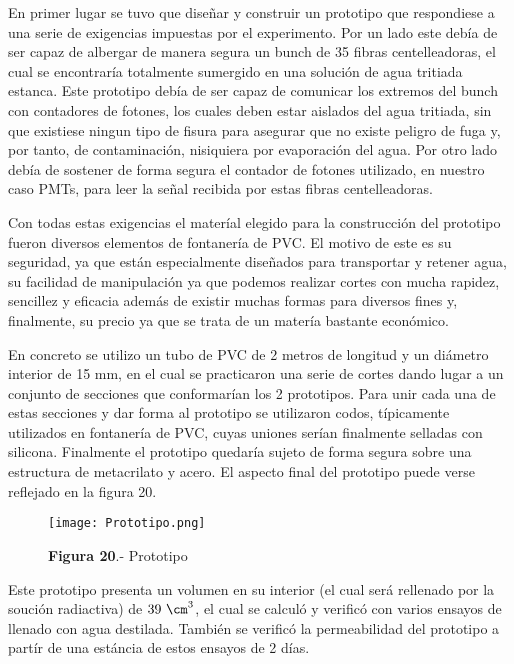 En primer lugar se tuvo que diseñar y construir un prototipo que respondiese a una serie de exigencias impuestas por el experimento. Por un lado este debía de ser capaz de albergar de manera segura  un bunch de 35 fibras centelleadoras, el cual se encontraría totalmente sumergido en una solución de agua tritiada estanca. Este prototipo debía de ser capaz de comunicar los extremos del bunch con contadores de fotones, los cuales deben estar aislados del agua tritiada, sin que existiese ningun tipo de fisura para asegurar que no existe peligro de fuga y, por tanto, de contaminación, nisiquiera por evaporación del agua. Por otro lado debía de sostener de forma segura el contador de fotones utilizado, en nuestro caso PMTs, para leer la señal recibida por estas fibras centelleadoras.

Con todas estas exigencias el materíal elegido para la construcción del prototipo fueron diversos elementos de fontanería de PVC. El motivo de este es su seguridad, ya que están especialmente diseñados para transportar y retener agua, su facilidad de manipulación ya que podemos realizar cortes con mucha rapidez, sencillez y eficacia además de existir muchas formas para diversos fines y, finalmente, su precio ya que se trata de un matería bastante económico. 

En concreto se utilizo un tubo de PVC de 2 metros de longitud y un diámetro interior de 15 mm, en el cual se practicaron una serie de cortes dando lugar a un conjunto de secciones que conformarían los 2 prototipos. Para unir cada una de estas secciones y dar forma al prototipo se utilizaron codos, típicamente utilizados en fontanería de PVC, cuyas uniones serían finalmente selladas con silicona. Finalmente el prototipo quedaría sujeto de forma segura sobre una estructura de metacrilato y acero. El aspecto final del prototipo puede verse reflejado en la figura 20.

\begin{figure}[hbtp]
\centering
\texttt{[image: Prototipo.png]}
\caption{\textbf{Figura 20}.- Prototipo}
\end{figure}

Este prototipo presenta un volumen en su interior (el cual será rellenado por la soución radiactiva) de $39~\cm^3$, el cual se calculó y verificó con varios ensayos de llenado con agua destilada. También se verificó la permeabilidad del prototipo a partír de una estáncia de estos ensayos de 2 días. 

